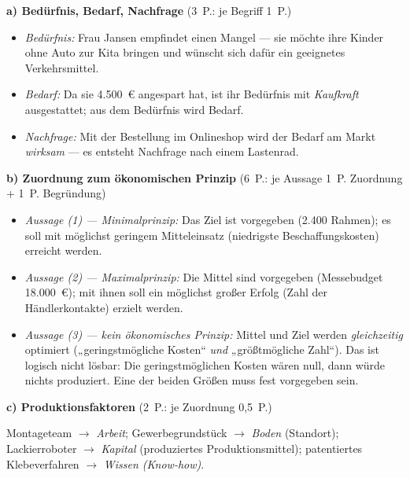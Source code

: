 
\begin{loesung}[title={Lösung Aufgabe~1.1 --- Wirtschaften und ökonomisches Prinzip}]
\textbf{a) Bedürfnis, Bedarf, Nachfrage} \hfill (3~P.: je Begriff 1~P.)
\begin{itemize}
  \item \emph{Bedürfnis:} Frau Jansen empfindet einen Mangel --- sie möchte ihre Kinder
    ohne Auto zur Kita bringen und wünscht sich dafür ein geeignetes Verkehrsmittel.
  \item \emph{Bedarf:} Da sie 4.500~€ angespart hat, ist ihr Bedürfnis mit
    \emph{Kaufkraft} ausgestattet; aus dem Bedürfnis wird Bedarf.
  \item \emph{Nachfrage:} Mit der Bestellung im Onlineshop wird der Bedarf am Markt
    \emph{wirksam} --- es entsteht Nachfrage nach einem Lastenrad.
\end{itemize}

\textbf{b) Zuordnung zum ökonomischen Prinzip} \hfill (6~P.: je Aussage 1~P. Zuordnung +
1~P. Begründung)
\begin{itemize}
  \item \emph{Aussage (1) --- Minimalprinzip:} Das Ziel ist vorgegeben (2.400 Rahmen); es
    soll mit möglichst geringem Mitteleinsatz (niedrigste Beschaffungskosten) erreicht
    werden.
  \item \emph{Aussage (2) --- Maximalprinzip:} Die Mittel sind vorgegeben (Messebudget
    18.000~€); mit ihnen soll ein möglichst großer Erfolg (Zahl der Händlerkontakte)
    erzielt werden.
  \item \emph{Aussage (3) --- kein ökonomisches Prinzip:} Mittel und Ziel werden
    \emph{gleichzeitig} optimiert („geringstmögliche Kosten`` \emph{und}
    „größtmögliche Zahl``). Das ist logisch nicht lösbar: Die geringstmöglichen Kosten
    wären null, dann würde nichts produziert. Eine der beiden Größen muss fest vorgegeben
    sein.
\end{itemize}

\textbf{c) Produktionsfaktoren} \hfill (2~P.: je Zuordnung 0,5~P.)

Montageteam $\rightarrow$ \emph{Arbeit}; Gewerbegrundstück $\rightarrow$ \emph{Boden}
(Standort); Lackierroboter $\rightarrow$ \emph{Kapital} (produziertes Produktionsmittel);
patentiertes Klebeverfahren $\rightarrow$ \emph{Wissen (Know-how)}.
\end{loesung}


